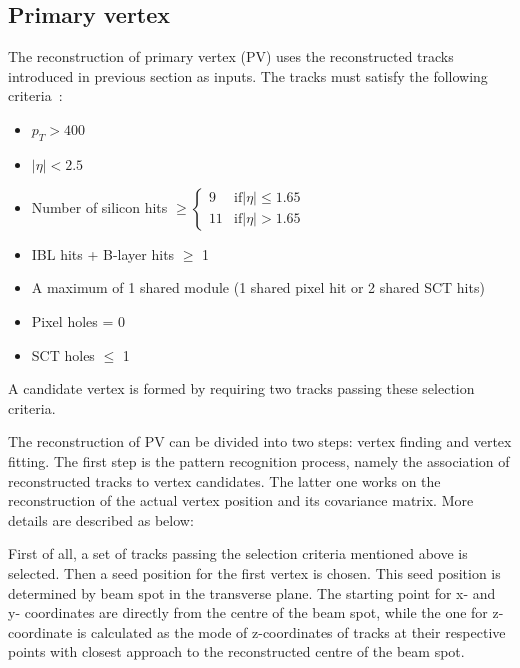 \subsection{Primary vertex}

The reconstruction of primary vertex (PV) uses the reconstructed tracks introduced in previous section as inputs.
The tracks must satisfy the following criteria~\cite{ATL-PHYS-PUB-2015-026}:
\begin{itemize}
	\item $p_{T} > 400$ ~\mev
	\item $|\eta| < 2.5$
	\item Number of silicon hits 
$\geq 
\begin{cases}
9&  \text{if} |\eta| \le 1.65\\
11& \text{if} |\eta| > 1.65
\end{cases}$
	\item IBL hits + B-layer hits $\ge$ 1
	\item A maximum of 1 shared module (1 shared pixel hit or 2 shared SCT hits)
	\item Pixel holes = 0
	\item SCT holes $\le$ 1
\end{itemize}
A candidate vertex is formed by requiring two tracks passing these selection criteria.

The reconstruction of PV can be divided into two steps\cite{Aaboud:2016rmg}: vertex finding and vertex fitting.
The first step is the pattern recognition process, namely the association of reconstructed tracks to vertex candidates.
The latter one works on the reconstruction of the actual vertex position and its covariance matrix.
More details are described as below:

First of all, a set of tracks passing the selection criteria mentioned above is selected.
Then a seed position for the first vertex is chosen.
This seed position is determined by beam spot in the transverse plane.
The starting point for x- and y- coordinates are directly from the centre of the beam spot,
while the one for z-coordinate is calculated as the mode of z-coordinates of tracks at their respective points with closest approach to the reconstructed centre of the beam spot. 

